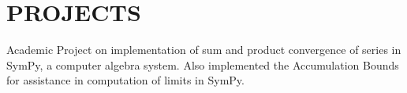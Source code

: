 \documentclass[]{deedy-resume-openfont}
\begin{document}
\begin{minipage}[t]{0.66\textwidth}


\section{PROJECTS}
Academic Project on implementation of sum and product convergence of series in SymPy, a computer algebra system.
Also implemented the Accumulation Bounds for assistance in computation of limits in SymPy.
\sectionsep


\sectionsep


\sectionsep




\sectionsep


\end{minipage}
\end{document}
